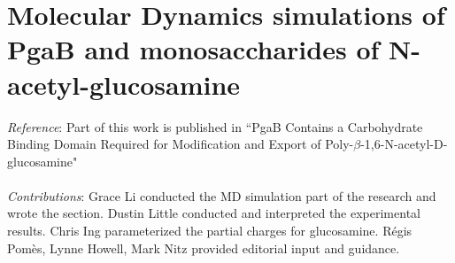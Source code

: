 \chapter[MD simulations of PgaB-glucosamine binding]{Molecular Dynamics simulations of PgaB and monosaccharides of N-acetyl-glucosamine}

\emph{Reference}: Part of this work is published in ``PgaB Contains a Carbohydrate Binding Domain Required for Modification and Export of Poly-$\beta$-1,6-N-acetyl-D-glucosamine"
\\
\\
\emph{Contributions}:
Grace Li conducted the MD simulation part of the research and wrote the section. Dustin Little conducted and interpreted the experimental results. Chris Ing parameterized the partial charges for glucosamine. R\'{e}gis Pom\`{e}s, Lynne Howell, Mark Nitz provided editorial input and guidance.

\newpage

%

